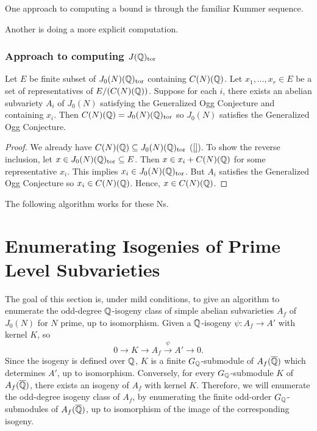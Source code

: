 \documentclass[11pt, proquest]{uwthesis}
\begin{document}
One approach to computing a bound is through the familiar Kummer sequence.

Another is doing a more explicit computation.

\subsection{Approach to computing $J(\mathbb{Q})_{\mathrm{tor}}$}%
\label{sub:approach_to_computing_j_qq__tor_}

\begin{proposition}
    Let $E$ be finite subset of $J_0(N)(\mathbb{Q})_{\mathrm{tor}}$ containing $C(N)(\mathbb{Q})$. Let
    $x_1,\ldots,x_r\in E$ be a set of representatives of $E/(C(N)(\mathbb{Q}))$.
    Suppose for each $i$, there exists an abelian subvariety $A_i$ of $J_0(N)$
    satisfying the Generalized Ogg Conjecture and containing $x_i$. Then
    $C(N)(\mathbb{Q})=J_0(N)(\mathbb{Q})_{\mathrm{tor}}$ so $J_0(N)$ satisfies the Generalized Ogg
    Conjecture.
\end{proposition}
\begin{proof}
    We already have $C(N)(\mathbb{Q})\subseteq J_0(N)(\mathbb{Q})_{\mathrm{tor}}$ (\ref{}). To show the
    reverse inclusion, let $x\in J_0(N)(\mathbb{Q})_{\mathrm{tor}}\subseteq E$. Then $x\in
    x_i+C(N)(\mathbb{Q})$ for some representative $x_i$. This implies $x_i\in
    J_0(N)(\mathbb{Q})_{\mathrm{tor}}$. But $A_i$ satisfies the Generalized Ogg Conjecture so
    $x_i\in C(N)(\mathbb{Q})$. Hence, $x\in C(N)(\mathbb{Q})$.
\end{proof}

The following algorithm works for these Ns.



\chapter{Enumerating Isogenies of Prime Level Subvarieties}%
\label{chap:isogeny_class}

The goal of this section is, under mild conditions, to give an algorithm to
enumerate the odd-degree $\mathbb{Q}$-isogeny class of simple abelian subvarieties
$A_f$ of $J_0(N)$ for $N$ prime, up to isomorphism. Given a $\mathbb{Q}$-isogeny
$\psi:A_f\to A'$ with kernel $K$, so
\[
    0 \to K \to A_f \overset{\psi}{\to} A' \to 0.
\]
Since the isogeny is defined over $\mathbb{Q}$, $K$ is a finite $G_{\mathbb{Q}}$-submodule of
$A_f(\overline{\mathbb{Q}})$ which determines $A'$, up to isomorphism. Conversely, for every
$G_{\mathbb{Q}}$-submodule $K$ of $A_f(\overline{\mathbb{Q}})$, there exists an isogeny of $A_f$ with
kernel $K$. Therefore, we will enumerate the odd-degree isogeny class of $A_f$,
by enumerating the finite odd-order $G_{\mathbb{Q}}$-submodules of $A_f(\overline{\mathbb{Q}})$, up to
isomorphism of the image of the corresponding isogeny. 
\end{document}
